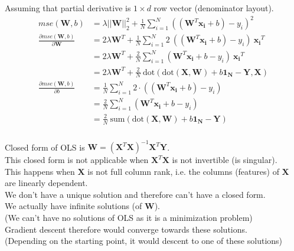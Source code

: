 \documentclass[12pt, fleqn]{article}
\begin{document}
\subsubsection{}
Assuming that partial derivative is $1 \times d$ row vector (denominator layout).
\begin{equation*}
  \begin{aligned}
    mse(\mathbf{W},b)                                      & = \lambda || \mathbf{W} ||_2^2 + \frac{1}{N} \sum_{i=1}^N ((\mathbf{W}^T \mathbf{x_i} + b) - y_i)^2                               \\
    \frac{\partial mse(\mathbf{W},b)}{\partial \mathbf{W}} & = 2 \lambda \mathbf{W}^T + \frac{1}{N} \sum_{i=1}^N 2 \ ((\mathbf{W}^T \mathbf{x_i} + b) - y_i) \ \mathbf{x_i}^T                  \\
                                                           & = 2 \lambda \mathbf{W}^T + \frac{2}{N} \sum_{i=1}^N (\mathbf{W}^T \mathbf{x_i} + b - y_i) \ \mathbf{x_i}^T                        \\
                                                           & = 2 \lambda \mathbf{W}^T + \frac{2}{N} \ \text{dot}(\text{dot}(\mathbf{X}, \mathbf{W}) + b \mathbf{1_N} - \mathbf{Y}, \mathbf{X}) \\
    \frac{\partial mse(\mathbf{W},b)}{\partial b}          & = \frac{1}{N} \sum_{i=1}^N 2 \cdot ((\mathbf{W}^T \mathbf{x_i} + b) - y_i)                                                        \\
                                                           & = \frac{2}{N} \sum_{i=1}^N (\mathbf{W}^T \mathbf{x_i} + b - y_i)                                                                  \\
                                                           & = \frac{2}{N} \ \text{sum}(\text{dot}(\mathbf{X}, \mathbf{W})  + b \mathbf{1_N} - \mathbf{Y})
  \end{aligned}
\end{equation*}

\subsubsection{}
Closed form of OLS is $\mathbf{W} = (\mathbf{X}^T \mathbf{X})^{-1} \mathbf{X}^T \mathbf{Y}$. \\
This closed form is not applicable when $\mathbf{X}^T \mathbf{X}$ is not invertible (is singular). \\
This happens when $\mathbf{X}$ is not full column rank, i.e. the columns (features) of $\mathbf{X}$ are linearly dependent. \\
We don't have a unique solution and therefore can't have a closed form. \\
We actually have infinite solutions (of $\mathbf{W}$). \\
(We can't have no solutions of OLS as it is a minimization problem) \\
Gradient descent therefore would converge towards these solutions. \\
(Depending on the starting point, it would descent to one of these solutions)
\end{document}
